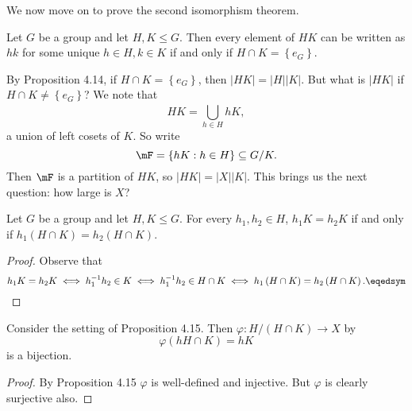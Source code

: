 \documentclass[pmath347]{subfiles}
\begin{document}
    \np We now move on to prove the second isomorphism theorem.

    \begin{prop}{}
        Let $G$ be a group and let $H,K\leq G$. Then every element of $HK$ can be written as $hk$ for some unique $h\in H, k\in K$ if and only if $H\cap K=\left\lbrace e_G \right\rbrace$.
    \end{prop}

    \noindent By Proposition 4.14, if $H\cap K = \left\lbrace e_G \right\rbrace$, then $\left| HK \right| = \left| H \right| \left| K \right|$. But what is $\left| HK \right| $ if $H\cap K\neq \left\lbrace e_G \right\rbrace$? We note that
    \begin{equation*}
        HK = \bigcup^{}_{h\in H} hK,
    \end{equation*}
    a union of left cosets of $K$. So write
    \begin{equation*}
        \mF = \left\lbrace hK: h\in H \right\rbrace \subseteq G /K.
    \end{equation*}
    Then $\mF$ is a partition of $HK$, so $\left| HK \right| = \left| X \right| \left| K \right|$. This brings us the next question: how large is $X$?

    \begin{prop}{}
        Let $G$ be a group and let $H,K\leq G$. For every $h_1,h_2\in H$, $h_1K=h_2K$ if and only if $h_1\left( H\cap K \right) = h_2\left( H\cap K \right)$.
    \end{prop}

    \begin{proof}
        Observe that
        \begin{equation*}
            h_1K = h_2K \iff h_1^{-1} h_2\in K \iff h_1^{-1} h_2\in H\cap K \iff h_1\left( H\cap K \right) = h_2\left( H\cap K \right). \eqedsym
        \end{equation*}
    \end{proof}

    \begin{cor}{}
        Consider the setting of Proposition 4.15. Then $\varphi: H /\left( H\cap K \right) \to X$ by
        \begin{equation*}
            \varphi\left( hH\cap K \right) = hK
        \end{equation*}
        is a bijection.
    \end{cor}	

    \begin{proof}
        By Proposition 4.15 $\varphi$ is well-defined and injective. But $\varphi$ is clearly surjective also.
    \end{proof}
\end{document}
